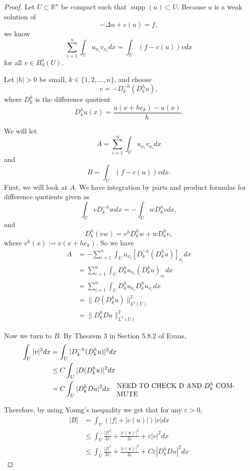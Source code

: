 \documentclass[a4paper]{article}
\newcommand{\R}{\mathbb{R}}
\newcommand{\supp}[1]{\mathop{\mathrm{supp}}\left(#1\right)}
\begin{document}
\begin{enumerate}
    \begin{proof}
      Let $U \subset \R^n$ be compact such that $\supp{u} \subset U$. Because $u$ is a weak solution of
      \[ -\Delta u + c(u) = f ,\]
      we know
      \[ \sum_{i = 1}^n \int_{U}^{} u_{x_i} v_{x_i} dx = \int_{U}^{} (f - c(u)) v dx \]
      for all $v \in H_0^1(U)$.

      Let $|h| > 0$ be small, $k \in \{1,2,\dots,n\}$, and choose
      \[ v = -D_k^{-h} (D_k^h u) ,\]
      where $D_k^h$ is the difference quotient
      \[ D_k^h u(x) = \frac{u(x + h e_k) - u(x)}{h} .\]

      We will let
      \[ A = \sum_{i=1}^n \int_{U}^{} u_{x_i} v_{x_i} dx \]
      and
      \[ B = \int_{U}^{} (f - c(u)) v dx .\]
      First, we will look at $A$.
      We have integration by parts and product formulas for difference quotients given as
      \[ \int_{U}^{} v D_k^{-h} w dx = - \int_{U}^{} w D_k^h v dx ,\]
      and
      \[ D_k^h (vw) = v^h D_k^h w + w D_k^h v ,\]
      where $v^h(x) := v(x + he_k)$.
      So we have
      \begin{align*}
        A &= - \sum_{i=1}^n \int_{U}^{} u_{x_i} \left[ D_k^{-h} (D_k^h u) \right]_{x_i} dx \\
        &= \sum_{i=1}^n \int_{U}^{} D_k^h u_{x_i} \left( D_k^h u \right)_{x_i} dx \quad \\
        &= \sum_{i=1}^n \int_{U}^{} D_k^h u_{x_i} D_k^h u_{x_i} dx \\
        & = \| D (D_k^h u) \|_{L^2(U)}^2 \\
        &= \| D_k^h Du \|_{L^2(U)}^2
      \end{align*}

      Now we turn to $B$.
      By Theorem 3 in Section 5.8.2 of Evans,
      \begin{align*}
        \int_{U}^{} |v|^2 dx &= \int_{U}^{} |D_k^{-h} (D_k^h u)|^2 dx \\
        & \leq C \int_{U}^{} |D (D_k^h u)|^2 dx \\
        &= C \int_{U}^{} |D_k^h Du|^2 dx \quad \parbox{6cm}{NEED TO CHECK D AND $D_k^h$ COMMUTE}
      \end{align*}

      Therefore, by using Young's inequality we get that for any $\varepsilon > 0$,
      \begin{align*}
        |B| &= \int_{U}^{} (|f| + |c(u)|) |v| dx \\
        &\leq \int_{U}^{} \frac{|f|^2}{2 \varepsilon} + \frac{|c(u)|^2}{2 \varepsilon} + \varepsilon |v|^2 dx \\
        &\leq \int_{U}^{} \frac{|f|^2}{2 \varepsilon} + \frac{|c(u)|^2}{2 \varepsilon} + C\varepsilon |D_k^h Du|^2 dx
      \end{align*}


\end{proof}
\end{enumerate}
\end{document}
